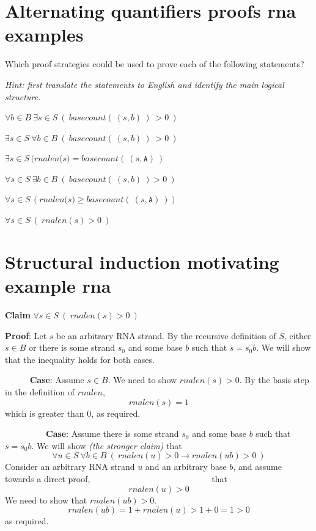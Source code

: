 \documentclass[12pt, oneside]{article}
\newcommand{\A}[0]{\texttt{A}}
\begin{document}
\section*{Alternating quantifiers proofs rna examples}


Which proof strategies could be used to prove each of the following statements?

{\it Hint: first translate the statements to English and identify the main logical structure.}


$\forall b \in B~\exists s \in S~(~basecount(~(s,b)~)~ > 0~)$

\vfill

$\exists s \in S~\forall b \in B~(~basecount(~(s,b)~)~ > 0~)$

\vfill

$\exists s \in S \, (\textit{rnalen(s)} = \textit{basecount}(~(s, \A)~)$

\vfill

$\forall s \in S ~\exists b\in B ~(~basecount(~(s,b)~) > 0~)$

\vfill

$\forall s \in S \, (\textit{rnalen(s)} \geq \textit{basecount}(~(s, \A)~))$

\vfill

$\forall s \in S~(~rnalen(s) > 0~)$

\vfill
 \vfill
\section*{Structural induction motivating example rna}


{\bf Claim} $\forall s \in S ~(~rnalen(s) > 0~)$

{\bf Proof}: Let $s$ be an arbitrary RNA strand. By the recursive definition of $S$,
either $s \in B$ or there is some strand $s_0$ and some base $b$ such that $s = s_0 b$.
We will show that the inequality holds for both cases.

{$\phantom{Basis}$} {\bf Case}: Assume $s \in B$. We need to show $rnalen(s) > 0$. 
By the basis step in the definition of $rnalen$,
$$rnalen(s) = 1$$
which is greater than $0$, as required.

{$\phantom{Recursive}$} {\bf Case}: Assume there is some strand $s_0$ and some base $b$ 
such that $s = s_0 b$. We will show {\it (the stronger claim)} that 
\[
    \forall u \in S ~\forall b \in B ~( ~\textit{rnalen}(u) >0  \to 
    \textit{rnalen}(ub) >0 ~)
\]
Consider an arbitrary RNA strand $u$ and an arbitrary base $b$, and assume towards a
direct proof,$~~{\phantom{ this is the induction hypothesis}}~~$ that
\[
    rnalen(u) > 0
\]
We need to show that $rnalen(ub) > 0$.
\[
    rnalen(ub) = 1 + rnalen (u) > 1 + 0 = 1 > 0
\]
as required. \vfill
\end{document}
